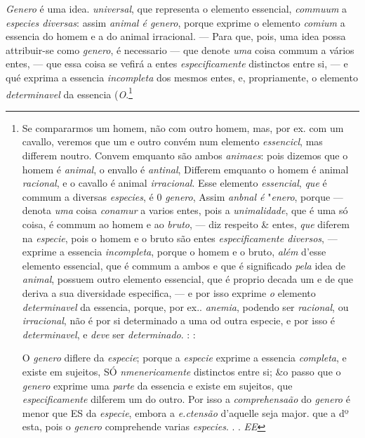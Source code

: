\emph{Genero} é uma idea. \emph{universal}, que representa o elemento essencial, \emph{commuum} a \emph{especies diversas}: assim \emph{animal é genero}, porque exprime o elemento \emph{comium} a essencia do homem e a do animal irracional. --- Para que, pois, uma idea possa attribuir-se como \emph{genero}, é necessario --- que denote \emph{uma} coisa commum a vários entes, --- que essa coisa se vefirá a entes \emph{especificamente} distinctos entre si, --- e qué exprima a essencia \emph{incompleta} dos mesmos entes, e, propriamente, o elemento \emph{determinavel} da essencia (\emph{O}.\footnote{Se compararmos um homem, não com outro homem, mas, por ex. com um cavallo, veremos que um e outro convém num elemento \emph{essencicl}, mas differem noutro. Convem emquanto são ambos \emph{animaes}: pois dizemos que o homem é \emph{animal}, o envallo é \emph{antinal}, Differem emquanto o homem é animal \emph{racional}, e o cavallo é animal \emph{irracional}. Esse elemento \emph{essencial}, \emph{que} é commum a diversas \emph{especies}, é 0 \emph{genero}, Assim \emph{anbnal é} "\emph{enero}, porque --- denota \emph{uma} coisa \emph{conamur} a varios entes, pois a \emph{unimalidade}, que é uma só coisa, é commum ao homem e ao \emph{bruto}, --- diz respeito \& entes, \emph{que} diferem na \emph{especie}, pois o homem e o bruto são entes \emph{especificamente diversos}, --- exprime a essencia \emph{incompleta}, porque o homem e o bruto, \emph{além} d'esse elemento essencial, que é commum a ambos e que é significado \emph{pela} idea de \emph{animal}, possuem outro elemento essencial, que é proprio decada um e de que deriva a sua diversidade especifica, --- e por isso exprime \emph{o} elemento \emph{determinavel} da essencia, porque, por ex.. \emph{anemia}, podendo ser \emph{racional}, ou \emph{irracional}, não é por si determinado a uma od outra especie, e por isso é \emph{determinavel}, e \emph{deve} ser \emph{determinado}. : :\par O \emph{genero} diflere da \emph{especie}; porque a \emph{especie} exprime a essencia \emph{completa}, e existe em sujeitos, SÓ \emph{nmenericamente} distinctos entre si; \&o passo que o \emph{genero} exprime uma \emph{parte} da essencia e existe em sujeitos, que \emph{especificamente} dilferem um do outro. Por isso a \emph{comprehensaão} do \emph{genero} é menor que ES da \emph{especie}, embora a \emph{e.ctensão} d'aquelle seja major. que a dº esta, pois o \emph{genero} comprehende varias \emph{especies}. . . \emph{EE}}



